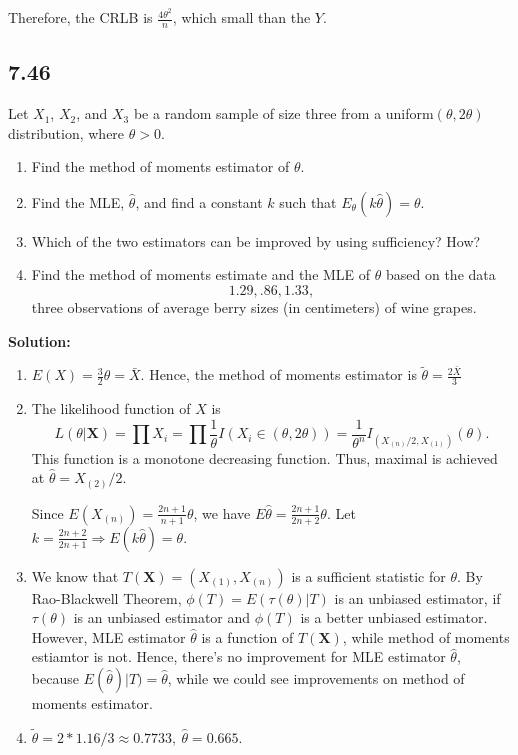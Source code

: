 \documentclass[11pt]{article}
\newcommand{\X}{\mathbf{X}}
\newcommand{\Sol}{\par {\bf Solution:}}
\begin{document}
Therefore, the CRLB is $\frac{4\theta^2}{n}$, which small than the $Y$.

\subsection*{7.46}
Let $X_1$, $X_2$, and $X_3$ be a random sample of size three from a uniform$(\theta, 2\theta)$ distribution, where $\theta > 0$.
\begin{enumerate}[label=(\alph*)]
    \item Find the method of moments estimator of $\theta$.
    \item Find the MLE, $\hat \theta$, and find a constant $k$ such that $E_\theta(k\hat \theta) = \theta$.
    \item Which of the two estimators can be improved by using sufficiency? How?
    \item Find the method of moments estimate and the MLE of $\theta$ based on the data
    \[
    1.29, .86, 1.33,
    \]
    three observations of average berry sizes (in centimeters) of wine grapes.
\end{enumerate}

\Sol
\begin{enumerate}[label=(\alph*)]
    \item $E(X) = \frac{3}{2}\theta = \bar X$. Hence, the method of moments estimator is $\tilde \theta = \frac{2\bar X}{3}$
    \item 
    The likelihood function of $X$ is
    \[
    L(\theta|\X) = \prod X_i = \prod \frac{1}{\theta} I(X_i \in (\theta, 2\theta)) = \frac{1}{\theta^n}I_{(X_{(n)}/2, X_{(1)})}{(\theta)}.
    \]
    This function is a monotone decreasing function. Thus, maximal is achieved at $\hat \theta = X_{(2)}/2$.
    
    Since $E(X_{(n)}) = \frac{2n+1}{n+1}\theta$, we have $E\hat \theta = \frac{2n+1}{2n + 2}\theta$. Let $k = \frac{2n+2}{2n+1} \Longrightarrow E(k\hat \theta) = \theta.$
    \item
    We know that $T(\X) = (X_{(1)}, X_{(n)})$ is a sufficient statistic for $\theta$. By Rao-Blackwell Theorem, $\phi(T) = E(\tau(\theta)|T)$ is an unbiased estimator, if $\tau(\theta)$ is an unbiased estimator and $\phi(T)$ is a better unbiased estimator. However, MLE estimator $\hat \theta$ is a function of $T(\X)$, while method of moments estiamtor is not. Hence, there's no improvement for MLE estimator $\hat \theta$, because $E(\hat \theta)|T) = \hat \theta$, while we could see improvements on method of moments estimator.
    \item
    $\tilde \theta = 2*1.16/3 \approx 0.7733, ~\hat \theta = 0.665$.
\end{enumerate}
\end{document}
